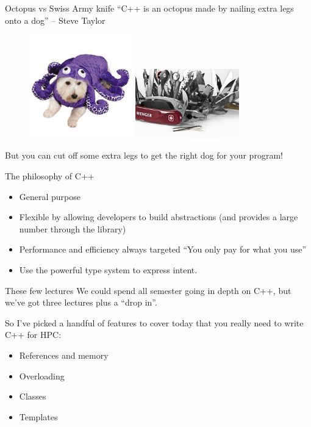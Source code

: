 \documentclass[presentation,t]{beamer}
\begin{document}
\begin{frame}{Octopus vs Swiss Army knife}
  ``C++ is an octopus made by nailing extra legs onto a dog'' -- Steve
  Taylor
  \begin{figure}
    \includegraphics[width=0.4\textwidth]{octodog}
    \hfill
    \includegraphics[width=0.4\textwidth]{sak}
  \end{figure}
  But you can cut off some extra legs to get the right dog for your
  program!
\end{frame}

\begin{frame}{The philosophy of C++}
  \begin{itemize}
  \item General purpose

  \item Flexible by allowing developers to build abstractions (and
    provides a large number through the library)

  \item Performance and efficiency always targeted
    ``You only pay for what you use''

  \item Use the powerful type system to express intent.
  \end{itemize}
\end{frame}

\begin{frame}{These few lectures}
  We could spend all semester going in depth on C++, but we've got
  three lectures plus a ``drop in''.

  So I've picked a handful of features to cover today that you really
  need to write C++ for HPC:
  \begin{itemize}
  \item References and memory
  \item Overloading
  \item Classes
  \item Templates
  \end{itemize}
\end{frame}
\end{document}
